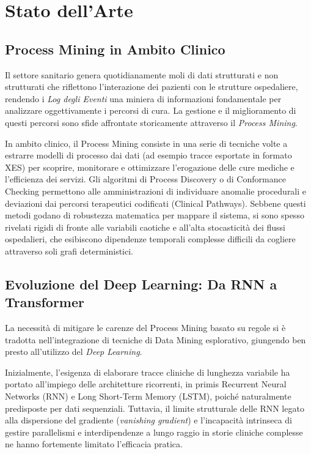 
\chapter{Stato dell'Arte}
\label{ch:stato_arte}

\section{Process Mining in Ambito Clinico}
Il settore sanitario genera quotidianamente moli di dati strutturati e non strutturati che riflettono l'interazione dei pazienti con le strutture ospedaliere, rendendo i \textit{Log degli Eventi} una miniera di informazioni fondamentale per analizzare oggettivamente i percorsi di cura. La gestione e il miglioramento di questi percorsi sono sfide affrontate storicamente attraverso il \textit{Process Mining}.

In ambito clinico, il Process Mining consiste in una serie di tecniche volte a estrarre modelli di processo dai dati (ad esempio tracce esportate in formato XES) per scoprire, monitorare e ottimizzare l'erogazione delle cure mediche e l'efficienza dei servizi. Gli algoritmi di Process Discovery o di Conformance Checking permettono alle amministrazioni di individuare anomalie procedurali e deviazioni dai percorsi terapeutici codificati (Clinical Pathways). Sebbene questi metodi godano di robustezza matematica per mappare il sistema, si sono spesso rivelati rigidi di fronte alle variabili caotiche e all'alta stocasticità dei flussi ospedalieri, che esibiscono dipendenze temporali complesse difficili da cogliere attraverso soli grafi deterministici.

\section{Evoluzione del Deep Learning: Da RNN a Transformer}
La necessità di mitigare le carenze del Process Mining basato su regole si è tradotta nell'integrazione di tecniche di Data Mining esplorativo, giungendo ben presto all'utilizzo del \textit{Deep Learning}. 

Inizialmente, l'esigenza di elaborare tracce cliniche di lunghezza variabile ha portato all'impiego delle architetture ricorrenti, in primis Recurrent Neural Networks (RNN) e Long Short-Term Memory (LSTM), poiché naturalmente predisposte per dati sequenziali. Tuttavia, il limite strutturale delle RNN legato alla dispersione del gradiente (\textit{vanishing gradient}) e l'incapacità intrinseca di gestire parallelismi e interdipendenze a lungo raggio in storie cliniche complesse ne hanno fortemente limitato l'efficacia pratica.

